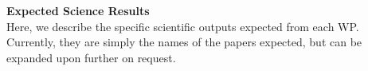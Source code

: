 \documentclass[11pt,usenatbib]{article}
\begin{document}



\noindent\textbf{Expected Science Results} \\
\noindent Here, we describe the specific scientific outputs expected from each WP. Currently, they are simply the names of the papers expected, but can be expanded upon further on request.
\end{document}
